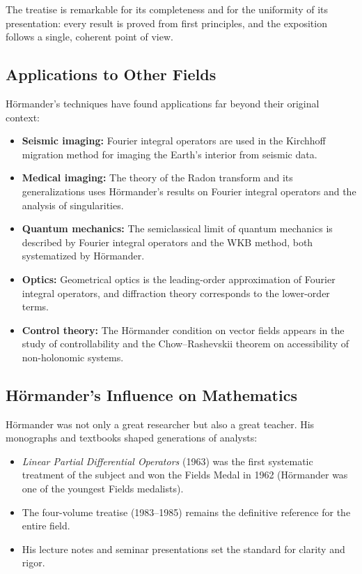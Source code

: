The treatise is remarkable for its completeness and for the uniformity
of its presentation: every result is proved from first principles, and
the exposition follows a single, coherent point of view.

\subsection{Applications to Other Fields}

H\"ormander's techniques have found applications far beyond their
original context:

\begin{itemize}
    \item \textbf{Seismic imaging:} Fourier integral operators are used
    in the Kirchhoff migration method for imaging the Earth's interior
    from seismic data.
    \item \textbf{Medical imaging:} The theory of the Radon transform
    and its generalizations uses H\"ormander's results on Fourier
    integral operators and the analysis of singularities.
    \item \textbf{Quantum mechanics:} The semiclassical limit of quantum
    mechanics is described by Fourier integral operators and the
    WKB method, both systematized by H\"ormander.
    \item \textbf{Optics:} Geometrical optics is the leading-order
    approximation of Fourier integral operators, and diffraction
    theory corresponds to the lower-order terms.
    \item \textbf{Control theory:} The H\"ormander condition on vector
    fields appears in the study of controllability and the
    Chow--Rashevskii theorem on accessibility of non-holonomic systems.
\end{itemize}

\subsection{H\"ormander's Influence on Mathematics}

H\"ormander was not only a great researcher but also a great teacher.
His monographs and textbooks shaped generations of analysts:
\begin{itemize}
    \item \textit{Linear Partial Differential Operators} (1963) was the
    first systematic treatment of the subject and won the Fields Medal
    in 1962 (H\"ormander was one of the youngest Fields medalists).
    \item The four-volume treatise (1983--1985) remains the definitive
    reference for the entire field.
    \item His lecture notes and seminar presentations set the standard
    for clarity and rigor.
\end{itemize}


